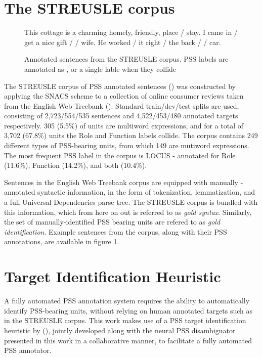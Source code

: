 \section{The STREUSLE corpus}\label{sec:streusle}

\begin{figure}
\begin{exe}\raggedright
\ex This cottage is a charming homely, friendly, place / stay.
\ex I came in / get a nice gift / / wife.
\ex He worked / it right / the back / / car.
\end{exe}
\caption{Annotated sentences from the STREUSLE corpus. PSS labels are annotated as , or a single lable when they collide}
\label{fig:streuslesamples}
\end{figure}


The STREUSLE corpus of PSS annotated sentences (\cite{snacs}) was constructed by applying the SNACS scheme to a collection of online consumer reviews taken from the English Web Treebank (\cite{ewtb}). Standard train/dev/test splits are used, consisting of 2,723/554/535 sentences and 4,522/453/480 annotated targets respectively. 305 (5.5\%) of units  are multiword expressions, and for a total of 3,702 (67.8\%) units the Role and Function labels collide. The corpus contains 249 different types of PSS-bearing units, from which 149 are mutiword expressions. The most frequent PSS label in the corpus is LOCUS - annotated for Role (11.6\%), Function (14.2\%), and both (10.4\%).

Sentences in the English Web Treebank corpus are equipped with manually -annotated syntactic information, in the form of tokenization, lemmatization, and a full Universal Dependencies parse tree. The STREUSLE corpus is bundled with this information, which from here on out is referred to as \emph{gold syntax}. Similarly, the set of manually-identified PSS bearing units are refered to as \emph{gold identification}. Example sentences from the corpus, along with their PSS annotations, are available in figure \ref{fig:streuslesamples}.

\section{Target Identification Heuristic} \label{sec:ident}

A fully automated PSS annotation system requires the ability to automatically identify PSS-bearing units, without relying on human annotated targets such as in the STREUSLE corpus. This work makes use of a PSS target identification heuristic by (\cite{snacs}), jointly developed along with the neural PSS disambiguator presented in this work in a collaborative manner, to facilitate a fully automated PSS annotator. 

